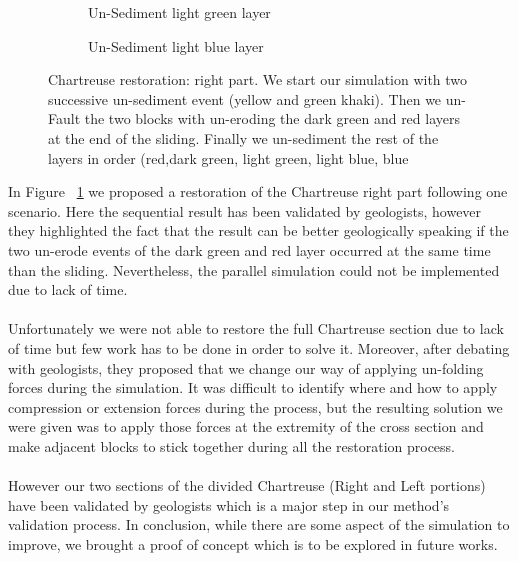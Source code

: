\documentclass[12pt, a4paper]{report} %
\begin{document}
\begin{center}
\begin{figure}[H]
\begin{subfigure}[b]{.45\linewidth}
	\caption{Un-Sediment light green layer}
	\end{subfigure}
	\begin{subfigure}[b]{.45\linewidth}
	\centering
	\caption{Un-Sediment light blue layer}
	\end{subfigure}
	
\caption{Chartreuse restoration: right part. We start our simulation with two successive un-sediment event (yellow and green khaki). Then we un-Fault the two blocks with un-eroding the dark green and red layers at the end of the sliding. Finally we un-sediment the rest of the layers in order (red,dark green, light green, light blue, blue}
\label{chartreusedrest}
\end{figure}
\end{center}	
In Figure ~\ref{chartreusedrest} we proposed a restoration of the Chartreuse right part following one scenario. Here the sequential result has been validated by geologists, however they highlighted the fact that the result can be better geologically speaking if the two un-erode events of the dark green and red layer occurred at the same time than the sliding. Nevertheless, the parallel simulation could not be implemented due to lack of time.\\\\
 Unfortunately we were not able to restore the full Chartreuse section due to lack of time but few work has to be done in order to solve it. Moreover, after debating with geologists, they proposed that we change our way of applying un-folding forces during the simulation. It was difficult to identify where and how to apply compression or extension forces during the process, but the resulting solution we were given was to apply those forces at the extremity of the cross section and make adjacent blocks to stick together during all the restoration process.\\\\
 However our two sections of the divided Chartreuse (Right and Left portions) have been validated by geologists which is a major step in our method's validation process. In conclusion, while there are some aspect of the simulation  to  improve, we brought a proof of concept which is to be explored in future works.
\end{document}

